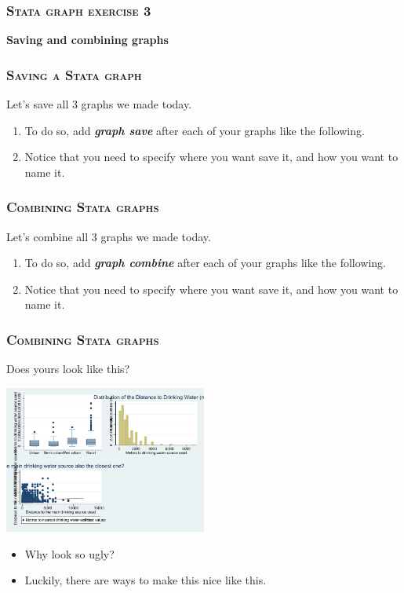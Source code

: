 \documentclass[10pt]{beamer}
\begin{document}
	\begin{frame}
	\frametitle{\textsc{Stata graph exercise 3}}
		\begin{center}
		\Large \textbf{Saving and combining graphs}
		\end{center}
	\end{frame}	
	
	\begin{frame}
	\frametitle{\textsc{Saving a Stata graph}}
		Let's save all 3 graphs we made today.
		\begin{enumerate}
			\item To do so, add \textbf{\textit{graph save}} after each of your graphs like the following.
	
			\item Notice that you need to specify where you want save it,
				  and how you want to name it.
		\end{enumerate}
	\end{frame}
	
	\begin{frame}
	\frametitle{\textsc{Combining Stata graphs}}
		Let's combine all 3 graphs we made today.
		\begin{enumerate}
			\item To do so, add \textbf{\textit{graph combine}} after each of your graphs like the following.
	
			\item Notice that you need to specify where you want save it,
				  and how you want to name it.
		\end{enumerate}
	\end{frame}
	
	\begin{frame}
	\frametitle{\textsc{Combining Stata graphs}}
		 Does yours look like this?
	
\begin{center}
    \includegraphics[width=0.5\textwidth]{combined.pdf}
\end{center}
		\begin{itemize}
			 \item Why look so ugly?
			\onslide<3-> \item Luckily, there are ways to make this nice like this.			
		\end{itemize}
	\end{frame}
				
\end{document}
